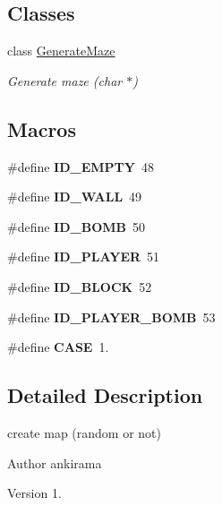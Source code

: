 \subsection*{Classes}
\begin{DoxyCompactItemize}
\item 
class \hyperlink{class_generate_maze}{Generate\+Maze}
\begin{DoxyCompactList}\small\item\em Generate maze (char $\ast$) \end{DoxyCompactList}\end{DoxyCompactItemize}
\subsection*{Macros}
\begin{DoxyCompactItemize}
\item 
\hypertarget{_generate_maze_8hh_aae29e3539bd594d7ade539814febe97b}{}\#define {\bfseries I\+D\+\_\+\+E\+M\+P\+T\+Y}~48\label{_generate_maze_8hh_aae29e3539bd594d7ade539814febe97b}

\item 
\hypertarget{_generate_maze_8hh_aa89e44f3dfbbd13570575ec6db35890c}{}\#define {\bfseries I\+D\+\_\+\+W\+A\+L\+L}~49\label{_generate_maze_8hh_aa89e44f3dfbbd13570575ec6db35890c}

\item 
\hypertarget{_generate_maze_8hh_a4a31a3a769277ff3354016c5c283f93c}{}\#define {\bfseries I\+D\+\_\+\+B\+O\+M\+B}~50\label{_generate_maze_8hh_a4a31a3a769277ff3354016c5c283f93c}

\item 
\hypertarget{_generate_maze_8hh_a5c5038bcbdf901c05bdd189b025d935e}{}\#define {\bfseries I\+D\+\_\+\+P\+L\+A\+Y\+E\+R}~51\label{_generate_maze_8hh_a5c5038bcbdf901c05bdd189b025d935e}

\item 
\hypertarget{_generate_maze_8hh_a758a0b802aec44cd2ea3146e645e056a}{}\#define {\bfseries I\+D\+\_\+\+B\+L\+O\+C\+K}~52\label{_generate_maze_8hh_a758a0b802aec44cd2ea3146e645e056a}

\item 
\hypertarget{_generate_maze_8hh_a43eba4f23bc9ae0c07693ac238e400e0}{}\#define {\bfseries I\+D\+\_\+\+P\+L\+A\+Y\+E\+R\+\_\+\+B\+O\+M\+B}~53\label{_generate_maze_8hh_a43eba4f23bc9ae0c07693ac238e400e0}

\item 
\hypertarget{_generate_maze_8hh_af2b30344be261ffe1c5aad12ab1f6f07}{}\#define {\bfseries C\+A\+S\+E}~1.\label{_generate_maze_8hh_af2b30344be261ffe1c5aad12ab1f6f07}

\end{DoxyCompactItemize}


\subsection{Detailed Description}
create map (random or not) 

\begin{DoxyAuthor}{Author}
ankirama 
\end{DoxyAuthor}
\begin{DoxyVersion}{Version}
1. 
\end{DoxyVersion}
